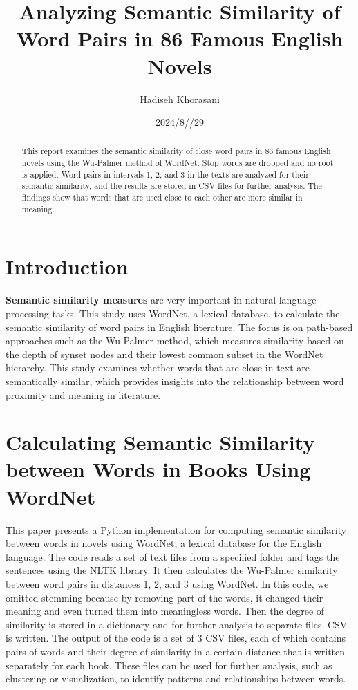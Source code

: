 \documentclass{article}
\title{Analyzing Semantic Similarity of Word Pairs in 86 Famous English Novels}
\author{Hadiseh Khorasani}
\date{2024/8//29}
\begin{document}
\maketitle

\begin{abstract}
This report examines the semantic similarity of close word pairs in 86 famous English novels using the Wu-Palmer method of WordNet. Stop words are dropped and no root is applied. Word pairs in intervals 1, 2, and 3 in the texts are analyzed for their semantic similarity, and the results are stored in CSV files for further analysis. The findings show that words that are used close to each other are more similar in meaning.
\end{abstract}

\section{Introduction}

\textbf{Semantic similarity measures} are very important in natural language processing tasks. This study uses WordNet, a lexical database, to calculate the semantic similarity of word pairs in English literature. The focus is on path-based approaches such as the Wu-Palmer method, which measures similarity based on the depth of synset nodes and their lowest common subset in the WordNet hierarchy. This study examines whether words that are close in text are semantically similar, which provides insights into the relationship between word proximity and meaning in literature.

\section{Calculating Semantic Similarity between Words in Books Using WordNet}

This paper presents a Python implementation for computing semantic similarity between words in novels using WordNet, a lexical database for the English language. The code reads a set of text files from a specified folder and tags the sentences using the NLTK library. It then calculates the Wu-Palmer similarity between word pairs in distances 1, 2, and 3 using WordNet. In this code, we omitted stemming because by removing part of the words, it changed their meaning and even turned them into meaningless words. Then the degree of similarity is stored in a dictionary and for further analysis to separate files. CSV is written. The output of the code is a set of 3 CSV files, each of which contains pairs of words and their degree of similarity in a certain distance that is written separately for each book. These files can be used for further analysis, such as clustering or visualization, to identify patterns and relationships between words.
\end{document}

